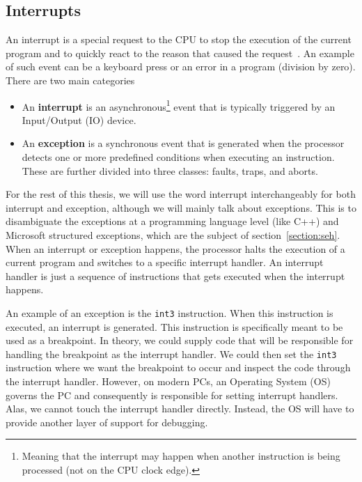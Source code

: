 \subsection{Interrupts}\label{section:interrupt}
An interrupt is a special request to the CPU to stop the execution of the
current program and to quickly react to the reason that caused the
request~\cite{computer-architecture}. An example of such event can be a
keyboard press or an error in a program (division by zero). There are two main
categories~\cite{intel-manual}
\begin{itemize}
    \item An \textbf{interrupt} is an asynchronous\footnote{Meaning that the
        interrupt may happen when another instruction is being processed (not
        on the CPU clock edge).} event that is typically triggered by an
        Input/Output (IO) device.
    \item An \textbf{exception} is a synchronous event that is
        generated when the processor detects one or more predefined conditions
        when executing an instruction. These are further divided into three
        classes: faults, traps, and aborts.
\end{itemize}


For the rest of this thesis, we will use the word interrupt interchangeably for
both interrupt and exception, although we will mainly talk about exceptions.
This is to disambiguate the exceptions at a programming language level (like
C++) and Microsoft structured exceptions, which are the subject of
section~\ref{section:seh}. When an interrupt or exception happens, the
processor halts the execution of a current program and switches to a specific
interrupt handler. An interrupt handler is just a sequence of instructions that
gets executed when the interrupt happens. 

An example of an exception is the \texttt{int3} instruction. When this
instruction is executed, an interrupt is generated. This instruction is
specifically meant to be used as a breakpoint. In theory, we could supply code
that will be responsible for handling the breakpoint as the interrupt handler.
We could then set the \texttt{int3} instruction where we want the breakpoint to
occur and inspect the code through the interrupt handler. However, on modern
PCs, an Operating System (OS) governs the PC and consequently is responsible
for setting interrupt handlers. Alas, we cannot touch the interrupt handler
directly. Instead, the OS will have to provide another layer of support for
debugging.

